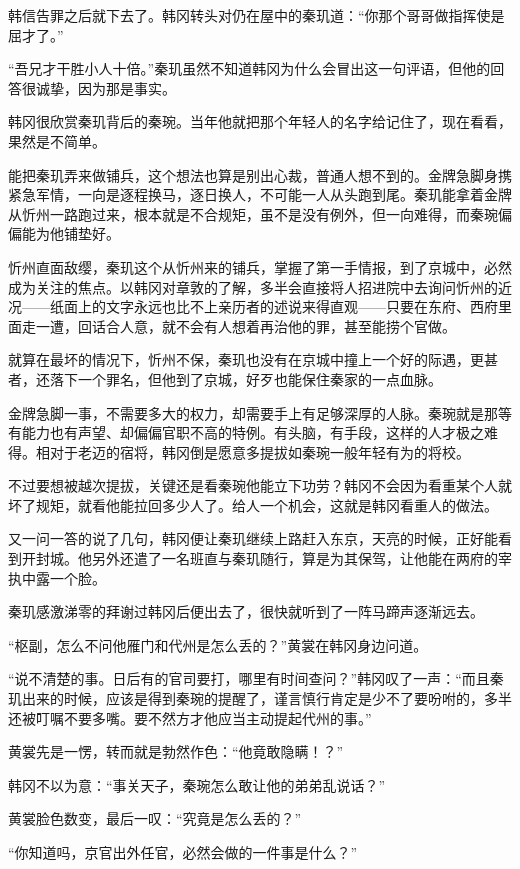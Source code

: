 韩信告罪之后就下去了。韩冈转头对仍在屋中的秦玑道：“你那个哥哥做指挥使是屈才了。”

“吾兄才干胜小人十倍。”秦玑虽然不知道韩冈为什么会冒出这一句评语，但他的回答很诚挚，因为那是事实。

韩冈很欣赏秦玑背后的秦琬。当年他就把那个年轻人的名字给记住了，现在看看，果然是不简单。

能把秦玑弄来做铺兵，这个想法也算是别出心裁，普通人想不到的。金牌急脚身携紧急军情，一向是逐程换马，逐日换人，不可能一人从头跑到尾。秦玑能拿着金牌从忻州一路跑过来，根本就是不合规矩，虽不是没有例外，但一向难得，而秦琬偏偏能为他铺垫好。

忻州直面敌缨，秦玑这个从忻州来的铺兵，掌握了第一手情报，到了京城中，必然成为关注的焦点。以韩冈对章敦的了解，多半会直接将人招进院中去询问忻州的近况——纸面上的文字永远也比不上亲历者的述说来得直观——只要在东府、西府里面走一遭，回话合人意，就不会有人想着再治他的罪，甚至能捞个官做。

就算在最坏的情况下，忻州不保，秦玑也没有在京城中撞上一个好的际遇，更甚者，还落下一个罪名，但他到了京城，好歹也能保住秦家的一点血脉。

金牌急脚一事，不需要多大的权力，却需要手上有足够深厚的人脉。秦琬就是那等有能力也有声望、却偏偏官职不高的特例。有头脑，有手段，这样的人才极之难得。相对于老迈的宿将，韩冈倒是愿意多提拔如秦琬一般年轻有为的将校。

不过要想被越次提拔，关键还是看秦琬他能立下功劳？韩冈不会因为看重某个人就坏了规矩，就看他能拉回多少人了。给人一个机会，这就是韩冈看重人的做法。

又一问一答的说了几句，韩冈便让秦玑继续上路赶入东京，天亮的时候，正好能看到开封城。他另外还遣了一名班直与秦玑随行，算是为其保驾，让他能在两府的宰执中露一个脸。

秦玑感激涕零的拜谢过韩冈后便出去了，很快就听到了一阵马蹄声逐渐远去。

“枢副，怎么不问他雁门和代州是怎么丢的？”黄裳在韩冈身边问道。

“说不清楚的事。日后有的官司要打，哪里有时间查问？”韩冈叹了一声：“而且秦玑出来的时候，应该是得到秦琬的提醒了，谨言慎行肯定是少不了要吩咐的，多半还被叮嘱不要多嘴。要不然方才他应当主动提起代州的事。”

黄裳先是一愣，转而就是勃然作色：“他竟敢隐瞒！？”

韩冈不以为意：“事关天子，秦琬怎么敢让他的弟弟乱说话？”

黄裳脸色数变，最后一叹：“究竟是怎么丢的？”

“你知道吗，京官出外任官，必然会做的一件事是什么？”

